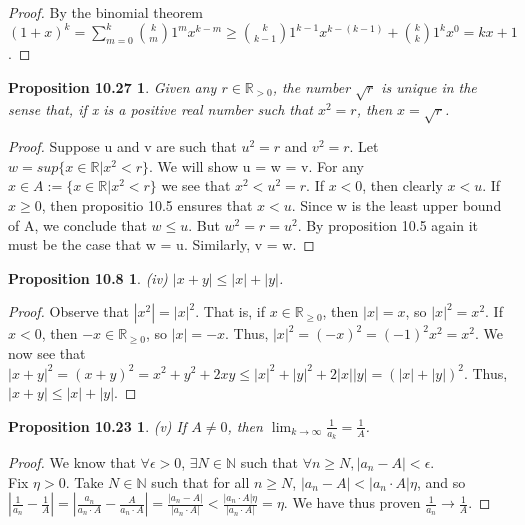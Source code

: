 \documentclass[12pt]{amsart}
\newcommand{\N}{\mathbb{N}}
\newcommand{\R}{\mathbb{R}}
\begin{document}
\begin{proof}
	By the binomial theorem $(1 + x)^k = \sum\limits_{m=0}^{k} \binom{k}{m} 1^mx^{k-m} \geq \binom{k}{k-1} 1^{k-1}x^{k - (k - 1)} + \binom{k}{k}1^kx^0 = kx + 1$.
\end{proof}

\newtheorem*{prop10.27}{Proposition 10.27}
\begin{prop10.27}
	Given any $r \in \R_{>0}$, the number $\sqrt{r}$ is unique in the sense that, if x is a positive real number such that $x^2 = r$, then $x = \sqrt{r}$.
\end{prop10.27}

\begin{proof}
	Suppose u and v are such that $u^2 = r$ and $v^2 = r$. Let $w = sup\{x \in \R | x^2 < r\}$. We will show u = w = v. For any $x \in A := \{x \in \R | x^2 < r\}$ we see that $x^2 < u^2 = r$. If $x < 0$, then clearly $x < u$. If $x \geq 0$, then propositio 10.5 ensures that $x < u$. Since w is the least upper bound of A, we conclude that $w \leq u$. But $w^2 = r = u^2$. By proposition 10.5 again it must be the case that w = u. Similarly, v = w.
\end{proof}

\newtheorem*{prop10.8}{Proposition 10.8}
\begin{prop10.8}
	\emph{(iv)} $|x + y| \leq |x| + |y|$.
\end{prop10.8}

\begin{proof}
	Observe that $|x^2| = |x|^2$. That is, if $x \in \R_{\geq0}$, then $|x| = x$, so $|x|^2 = x^2$. If $x < 0$, then $-x \in \R_{\geq 0}$, so $|x| = -x$. Thus, $|x|^2 = (-x)^2 = (-1)^2 x^2 = x^2$. We now see that $|x + y|^2 = (x + y)^2 = x^2 + y^2 + 2xy \leq |x|^2 + |y|^2 + 2|x||y| = (|x| + |y|)^2$. Thus, $|x + y| \leq |x| + |y|$.
\end{proof}

\newtheorem*{prop10.23}{Proposition 10.23}
\begin{prop10.23}
	\emph{(v)} If $A \neq 0$, then $\displaystyle{\lim_{k \to \infty} \frac{1}{a_k} = \frac{1}{A}}$.
\end{prop10.23}

\begin{proof}
	We know that $\forall \epsilon > 0$, $ \exists N \in \N$ such that $\forall n \geq N, |a_n - A| < \epsilon.$
	\\Fix $\eta > 0$. Take $N \in \N$ such that for all $n \geq N$, $|a_n - A| < |a_n \cdot A|\eta$, and so $|\frac{1}{a_n} - \frac{1}{A}| = |\frac{a_n}{a_n \cdot A} - \frac{A}{a_n \cdot A}| = \frac{|a_n - A|}{|a_n \cdot A|} < \frac{|a_n \cdot A|\eta}{|a_n \cdot A|} = \eta$. We have thus proven $\frac{1}{a_n} \rightarrow \frac{1}{A}$.
\end{proof}
\end{document}

